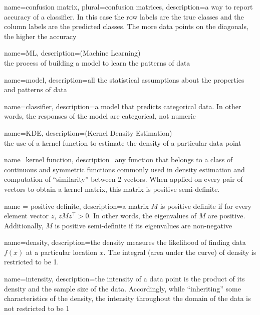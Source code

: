 {
        name=confusion matrix,
        plural=confusion matrices,
        description={a way to report accuracy of a classifier. In this case the row labels are the true classes and the column labels are the predicted classes. The more data points on the diagonals, the higher the accuracy}
}

{
        name=ML,
        description={(Machine Learning) \\ the process of building a model to learn the patterns of data}
}

{
        name=model,
        description={all the statistical assumptions about the properties and patterns of data}
}

{
        name=classifier,
        description={a model that predicts categorical data. In other words, the responses of the model are categorical, not numeric}
}

{
        name=KDE,
        description={(Kernel Density Estimation) \\ the use of a kernel function to estimate the density of a particular data point}
}

{
        name=kernel function,
        description={any function that belongs to a class of continuous and symmetric functions commonly used in density estimation and computation of ``similarity'' between 2 vectors. When applied on every pair of vectors to obtain a kernel matrix, this matrix is positive semi-definite.}
}

{
        name = positive definite,
        description={a matrix $M$ is positive definite if for every element vector $z$, $zMz^\intercal > 0$. In other words, the eigenvalues of $M$ are positive. Additionally, $M$ is positive semi-definite if its eigenvalues are non-negative}
}

{
        name=density,
        description={the density measures the likelihood of finding data $f(x)$ at a particular location $x$. The integral (area under the curve) of density is restricted to be 1.}
}

{
        name=intensity,
        description={the intensity of a data point is the product of its density and the sample size of the data. Accordingly, while ``inheriting'' some characteristics of the density, the intensity throughout the domain of the data is not restricted to be 1}
}

